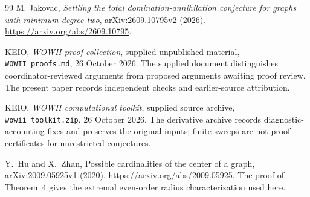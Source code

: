 \documentclass[11pt,a4paper]{article}
\theoremstyle{remark}
\begin{document}
\begin{thebibliography}{99}
M. Jakovac,
\emph{Settling the total domination-annihilation conjecture for graphs with minimum degree two},
arXiv:2609.10795v2 (2026).
\url{https://arxiv.org/abs/2609.10795}.



KEIO, \emph{WOWII proof collection}, supplied unpublished material,
\texttt{WOWII\_proofs.md}, 26 October 2026.
The supplied document distinguishes coordinator-reviewed arguments
from proposed arguments awaiting proof review. The present paper
records independent checks and earlier-source attribution.

KEIO, \emph{WOWII computational toolkit}, supplied source archive,
\texttt{wowii\_toolkit.zip}, 26 October 2026.
The derivative archive records diagnostic-accounting fixes and preserves
the original inputs; finite sweeps are not proof certificates for
unrestricted conjectures.

Y.~Hu and X.~Zhan,
Possible cardinalities of the center of a graph,
arXiv:2009.05925v1 (2020).
\url{https://arxiv.org/abs/2009.05925}.
The proof of Theorem~4 gives the extremal even-order radius
characterization used here.

\end{thebibliography}
\endgroup

\clearpage\appendix
\end{document}
